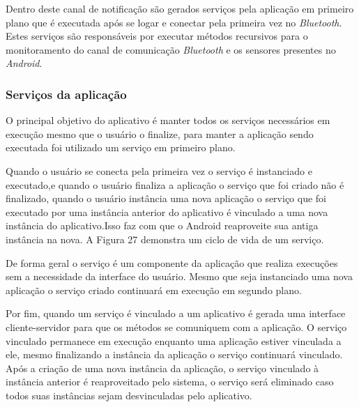  Dentro deste canal de notificação são gerados serviços pela aplicação em primeiro plano que é executada após se logar e conectar pela primeira vez no \textit{Bluetooth}.
 Estes serviços são responsáveis por executar métodos recursivos para o monitoramento do canal de comunicação \textit{Bluetooth} e os sensores presentes no \textit{Android}.



\subsubsection{Serviços da aplicação}

O principal objetivo do aplicativo é manter todos os serviços necessários em execução mesmo que o usuário o finalize, para manter a aplicação sendo executada foi  utilizado um serviço em primeiro plano.

Quando o usuário se conecta  pela primeira vez o serviço é instanciado e executado,e  quando o usuário finaliza a aplicação o serviço que foi criado não é finalizado, quando o usuário instância uma nova aplicação  o serviço que foi executado por uma instância anterior do aplicativo é vinculado a uma nova instância do aplicativo.Isso faz com que o Android reaproveite sua antiga instância na nova. A Figura 27 demonstra um ciclo de vida de um serviço. 

De forma geral o serviço é um componente da aplicação que realiza execuções sem a necessidade da interface do usuário. Mesmo que seja instanciado uma nova aplicação  o serviço criado continuará em execução em segundo plano.


Por fim, quando um serviço é vinculado a um aplicativo  é gerada uma interface cliente-servidor para que os métodos se comuniquem com a aplicação.  O serviço vinculado permanece em execução enquanto uma aplicação estiver vinculada a ele, mesmo finalizando a instância da aplicação o serviço continuará vinculado. Após a criação de uma nova instância da aplicação, o serviço vinculado à instância anterior é reaproveitado pelo sistema, o serviço será eliminado caso todos suas instâncias sejam desvinculadas pelo aplicativo.

